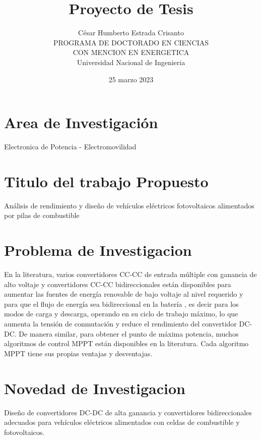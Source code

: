 \documentclass[12pt]{article}
\title{Proyecto de Tesis}
\author{César Humberto Estrada Crisanto \\
PROGRAMA DE DOCTORADO EN CIENCIAS \\ CON MENCION EN ENERGETICA \\
Universidad Nacional de Ingenieria}
\date{25 marzo 2023}
\begin{document}
	\maketitle
	
\begin{abstract}
	
	

\end{abstract}

\tableofcontents

\newpage
	
\section{Area de Investigación}
Electronica de Potencia - Electromovilidad	


\section{Titulo del trabajo Propuesto}
Análisis de rendimiento y diseño de vehículos eléctricos fotovoltaicos alimentados por pilas de combustible

\section{Problema de Investigacion}
En la literatura, varios convertidores CC-CC de entrada múltiple con ganancia de alto voltaje y convertidores CC-CC bidireccionales están disponibles para aumentar las fuentes de energía renovable de bajo voltaje al nivel requerido y para que el flujo de energía sea bidireccional en la batería , es decir para los modos de carga y descarga, operando en su ciclo de trabajo máximo, lo que aumenta la tensión de conmutación y reduce el rendimiento del convertidor DC-DC. De manera similar, para obtener el punto de máxima potencia, muchos algoritmos de control MPPT están disponibles en la literatura. Cada algoritmo MPPT tiene sus propias ventajas y desventajas.

\section{Novedad de Investigacion}
Diseño de convertidores DC-DC de alta ganancia y convertidores bidireccionales adecuados para vehículos eléctricos alimentados con celdas de combustible y fotovoltaicos.
\end{document}
